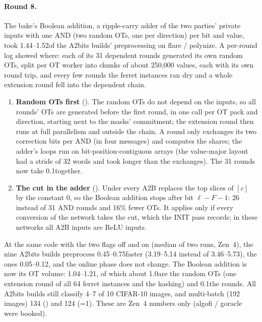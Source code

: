 \paragraph{Round 8.}\label{sec:triadround8} The bake's Boolean addition, a ripple-carry adder of the two parties'
private inputs with one AND (two random OTs, one per direction) per bit and value, took 1.44--1.52\s of the A2bits
builds' preprocessing on flare / polynize. A per-round log showed where: each of its 31 dependent rounds generated its
own random OTs, split per OT worker into chunks of about 250,000 values, each with its own round trip, and every few
rounds the ferret instances ran dry and a whole extension round fell into the dependent chain.
\begin{enumerate}\itemsep1pt
\item \textbf{Random OTs first} (). The random OTs do not depend on the inputs, so all rounds'
  OTs are generated before the first round, in one call per OT pack and direction, starting next to the masks'
  commitment; the extension round then runs at full parallelism and outside the chain. A round only exchanges its two
  correction bits per AND (in four messages) and computes the shares; the adder's loops run on bit-position-contiguous
  arrays (the value-major layout had a stride of 32 words and took longer than the exchanges). The 31 rounds now take
  0.1\s together.
\item \textbf{The cut in the adder} (). Under  every A2B replaces the top
   slices of $[c]$ by the constant 0, so the Boolean addition stops after bit $\ell - F - 1$: 26
  instead of 31 AND rounds and 16\% fewer OTs. It applies only if every conversion of the network takes the cut, which
  the INIT pass records; in these networks all A2B inputs are ReLU inputs.
\end{enumerate}
At the same code with the two flags off and on (median of two runs, Zen~4), the nine  A2bits builds
preprocess 0.45--0.75\s faster (3.19--5.14 instead of 3.46--5.73\s), the  ones 0.05--0.12\s, and the
online phase does not change. The Boolean addition is now its OT volume: 1.04--1.21\s, of which about 1.0\s are the
random OTs (one extension round of all 64 ferret instances and the hashing) and 0.1\s the rounds. All A2bits builds
still classify 4--7 of 10 CIFAR-10 images, and multi-batch (192 images) 134 () and 124 (=1).
These are Zen~4 numbers only (algofi / goracle were booked).

